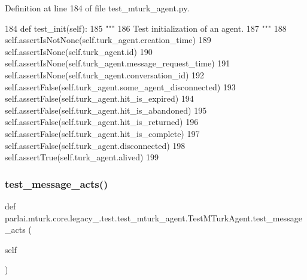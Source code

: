 Definition at line 184 of file test\+\_\+mturk\+\_\+agent.\+py.


\begin{DoxyCode}
184     \textcolor{keyword}{def }test\_init(self):
185         \textcolor{stringliteral}{"""}
186 \textcolor{stringliteral}{        Test initialization of an agent.}
187 \textcolor{stringliteral}{        """}
188         self.assertIsNotNone(self.turk\_agent.creation\_time)
189         self.assertIsNone(self.turk\_agent.id)
190         self.assertIsNone(self.turk\_agent.message\_request\_time)
191         self.assertIsNone(self.turk\_agent.conversation\_id)
192         self.assertFalse(self.turk\_agent.some\_agent\_disconnected)
193         self.assertFalse(self.turk\_agent.hit\_is\_expired)
194         self.assertFalse(self.turk\_agent.hit\_is\_abandoned)
195         self.assertFalse(self.turk\_agent.hit\_is\_returned)
196         self.assertFalse(self.turk\_agent.hit\_is\_complete)
197         self.assertFalse(self.turk\_agent.disconnected)
198         self.assertTrue(self.turk\_agent.alived)
199 
\end{DoxyCode}
\mbox{\label{classparlai_1_1mturk_1_1core_1_1legacy__2018_1_1test_1_1test__mturk__agent_1_1TestMTurkAgent_a0835afc555b43ee116569e8c8e6aee6c}} 
\subsubsection{\texorpdfstring{test\+\_\+message\+\_\+acts()}{test\_message\_acts()}}
{\footnotesize\ttfamily def parlai.\+mturk.\+core.\+legacy\+\_.\+test.\+test\+\_\+mturk\+\_\+agent.\+Test\+M\+Turk\+Agent.\+test\+\_\+message\+\_\+acts (\begin{DoxyParamCaption}\item[{}]{self }\end{DoxyParamCaption})}



